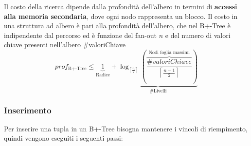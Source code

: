 \documentclass[a4paper]{article}
\begin{document}
\vspace{1em}
\noindent
Il costo della ricerca dipende dalla profondità dell'albero in termini di
\textbf{accessi alla memoria secondaria}, dove ogni nodo rappresenta un blocco. 
Il costo in una struttura ad albero è pari alla profondità dell'albero, che nel
B+-Tree è indipendente dal percorso ed è funzione del fan-out \( n \) e del numero
di valori chiave presenti nell'albero \#valoriChiave
\[
  prof_{\text{B+-Tree}} \le \underbrace{1}_{\text{Radice}} + 
  \underbrace{\log_{\left\lceil \frac{n}{2} \right\rceil} \left( 
      \overbrace{\frac{\#valoriChiave}{\left\lceil \frac{n-1}{2} \right\rceil }}^{\text{Nodi foglia massimi}}
  \right)}_{\text{\# Livelli}}
\] 

\subsubsection*{Inserimento}
Per inserire una tupla in un B+-Tree bisogna mantenere i vincoli di riempimento, quindi
vengono eseguiti i seguenti passi:
\end{document}
